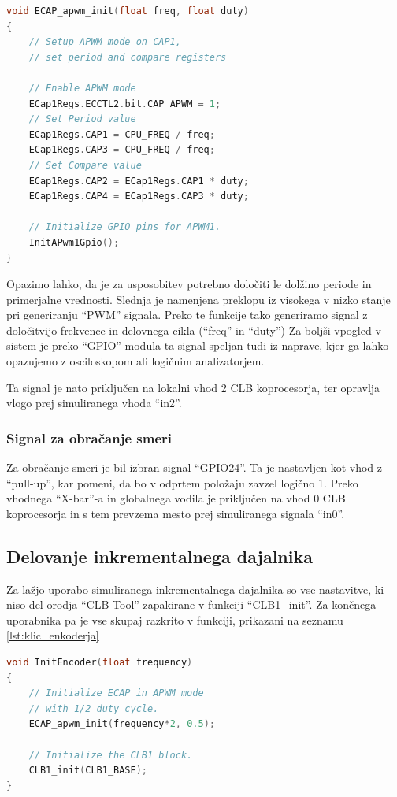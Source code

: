 \documentclass[a4paper]{article}
\begin{document}
\begin{lstlisting}[language=C, caption={Implementacija funkcije za usposobitev ``eCAP'' modula v ``apwm'' načinu}, label={lst:ecap_init}]
void ECAP_apwm_init(float freq, float duty)
{
    // Setup APWM mode on CAP1,
    // set period and compare registers

    // Enable APWM mode
    ECap1Regs.ECCTL2.bit.CAP_APWM = 1;
    // Set Period value
    ECap1Regs.CAP1 = CPU_FREQ / freq;
    ECap1Regs.CAP3 = CPU_FREQ / freq;
    // Set Compare value
    ECap1Regs.CAP2 = ECap1Regs.CAP1 * duty;
    ECap1Regs.CAP4 = ECap1Regs.CAP3 * duty;

    // Initialize GPIO pins for APWM1.
    InitAPwm1Gpio();
}
\end{lstlisting}

Opazimo lahko, da je za usposobitev potrebno določiti le dolžino periode in primerjalne vrednosti. Slednja je namenjena preklopu iz visokega v nizko stanje pri generiranju ``PWM'' signala. Preko te funkcije tako generiramo signal z določitvijo frekvence in delovnega cikla (``freq'' in ``duty'') Za boljši vpogled v sistem je preko ``GPIO'' modula ta signal speljan tudi iz naprave, kjer ga lahko opazujemo z osciloskopom ali logičnim analizatorjem.

Ta signal je nato priključen na lokalni vhod 2 CLB koprocesorja, ter opravlja vlogo prej simuliranega vhoda ``in2''.

\subsubsection{Signal za obračanje smeri}
Za obračanje smeri je bil izbran signal ``GPIO24''. Ta je nastavljen kot vhod z ``pull-up'', kar pomeni, da bo v odprtem položaju zavzel logično 1. Preko vhodnega ``X-bar''-a in globalnega vodila je priključen na vhod 0 CLB koprocesorja in s tem prevzema mesto prej simuliranega signala ``in0''.

\subsection{Delovanje inkrementalnega dajalnika}
Za lažjo uporabo simuliranega inkrementalnega dajalnika so vse nastavitve, ki niso del orodja ``CLB Tool'' zapakirane v funkciji ``CLB1\_init''.
Za končnega uporabnika pa je vse skupaj razkrito v funkciji, prikazani na seznamu \ref{lst:klic_enkoderja}

\begin{lstlisting}[language=C, caption={Implementacija funkcije za nastavitev inkrementalnega dajalnika}, label={lst:klic_enkoderja}]
void InitEncoder(float frequency)
{
    // Initialize ECAP in APWM mode
    // with 1/2 duty cycle.
    ECAP_apwm_init(frequency*2, 0.5);

    // Initialize the CLB1 block.
    CLB1_init(CLB1_BASE);
}
\end{lstlisting}
\end{document}
